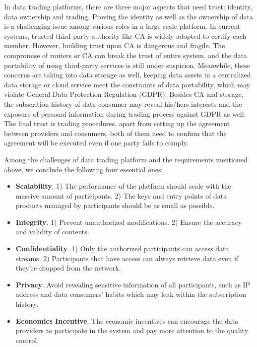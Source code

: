 \documentclass[conference]{IEEEtran}
\begin{document}
In data trading platforms, there are three major aspects that need trust: identity, data ownership and trading. Proving the identity as well as the ownership of data is a challenging issue among various roles in a large scale platform. In current systems, trusted third-party authority like CA is widely adopted to certify each member. However, building trust upon CA is dangerous and fragile. The compromise of routers or CA can break the trust of entire system, and the data portability of using third-party services is still under suspicion. Meanwhile, these concerns are taking into data storage as well, keeping data assets in a centralized data storage or cloud service meet the constraints of data portability, which may violate General Data Protection Regulation (GDPR)\cite{GDPR}. Besides CA and storage, the subscrition history of data consumer may reveal his/hers interests and the exposure of personal information during trading process against GDPR as well. The final trust is trading procedures, apart from setting up the agreement between providers and consumers, both of them need to confirm that the agreement will be executed even if one party fails to comply.

Among the challenges of data trading platform\cite{BigDataMarket} and the requirements mentioned above, we conclude the following four essential ones:
\begin{itemize}
	\item \textbf{Scalability}. 
1) The performance of the platform should scale with the massive amount of participants. 2) The keys and entry points of data products managed by participants should be as small as possible. 
	\item \textbf{Integrity}. 1) Prevent unauthorized modifications. 2) Ensure the accuracy and validity of contents.	
	\item \textbf{Confidentiality}. 
1) Only the authorized participants can access data streams. 2) Participants that have access can always retrieve data even if they're dropped from the network.	
	\item \textbf{Privacy}. Avoid revealing sensitive information of all participants, such as IP address and data consumers' habits which may leak within the subscription history.
	\item \textbf{Economics Incentive}. The economic incentives can encourage the data providers to participate in the system and pay more attention to the quality control. 
\end{itemize}
\end{document}
